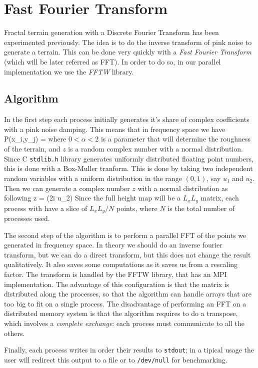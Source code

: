 \section{Fast Fourier Transform}
Fractal terrain generation with a Discrete Fourier Transform has been experimented previously\cite{koh1992fast}.
The idea is to do the inverse transform of pink noise to generate a terrain.
This can be done very quickly with a {\em Fast Fourier Transform} (which will be later referred as FFT). In order to do so, in our parallel implementation we use the {\em FFTW}\cite{fftw} library.
\subsection{Algorithm}
In the first step each process initially generates it's share of complex coefficients with a pink noise damping. This means that in frequency space we have
\be
    P(x_i,y_j) = 
\ee
where $0<\alpha<2$ is a parameter that will determine the roughness of the terrain, and $z$ is a random complex number with a normal distribution.
Since C {\tt stdlib.h} library generates uniformly distributed floating point numbers, this is done with a Box-Muller tranform. 
This is done by taking two independent random variables with a uniform distribution in the range $(0,1)$, say $u_1$ and $u_2$. Then we can generate a complex number $z$ with a normal distribution as following
\be
    z =  \exp(2\pi i u_2)
\ee
Since the full height map will be a $L_x L_y$ matrix, each process with have a slice of $L_x L_y / N$ points, where $N$ is the total number of processes used. 

The second step of the algorithm is to perform a parallel FFT  of the points we generated in frequency space. 
In theory we should do an inverse fourier transform, but we can do a direct transform, but this does not change the result qualitatively. 
It also saves some computations as it saves us from a rescaling factor.
The transform is handled by the FFTW library, that has an MPI implementation.
The advantage of this configuration is that the matrix is distributed along the processes, so that the algorithm can handle arrays that are too big to fit on a single process.
The disadvantage of performing an FFT on a distributed memory system is that the algorithm requires to do a transpose, which involves a {\em complete exchange}: each process must communicate to all the others.

Finally, each process writes in order their results to {\tt stdout}; in a tipical usage the user will redirect this output to a file or to {\tt /dev/null} for benchmarking.

